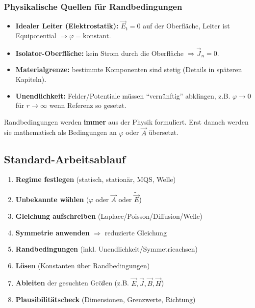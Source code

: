 \documentclass[a4paper]{article}
\newcommand{\imp}[1]{{\color{accent}\bfseries #1}}
\newcommand{\E}{\vec E}
\newcommand{\Hf}{\vec H}
\newcommand{\B}{\vec B}
\newcommand{\J}{\vec J}
\newcommand{\A}{\vec A}
\begin{document}
\subsubsection{Physikalische Quellen für Randbedingungen}
\begin{itemize}
  \item \imp{Idealer Leiter (Elektrostatik):} $\E_t=0$ auf der Oberfläche, Leiter ist Equipotential $\Rightarrow \varphi=\text{konstant}$.
  \item \imp{Isolator-Oberfläche:} kein Strom durch die Oberfläche $\Rightarrow \J_n=0$.
  \item \imp{Materialgrenze:} bestimmte Komponenten sind stetig (Details in späteren Kapiteln).
  \item \imp{Unendlichkeit:} Felder/Potentiale müssen ``vernünftig'' abklingen, z.B. $\varphi\to 0$ für $r\to\infty$ wenn Referenz so gesetzt.
\end{itemize}

\begin{merke}
Randbedingungen werden \imp{immer} aus der Physik formuliert.
Erst danach werden sie mathematisch als Bedingungen an $\varphi$ oder $\A$ übersetzt.
\end{merke}

\subsection{Standard-Arbeitsablauf}

\begin{vorgehen}
\begin{enumerate}
  \item \imp{Regime festlegen} (statisch, stationär, MQS, Welle)
  \item \imp{Unbekannte wählen} ($\varphi$ oder $\A$ oder $\tilde{\E}$)
  \item \imp{Gleichung aufschreiben} (Laplace/Poisson/Diffusion/Welle)
  \item \imp{Symmetrie anwenden} $\Rightarrow$ reduzierte Gleichung
  \item \imp{Randbedingungen} (inkl. Unendlichkeit/Symmetrieachsen)
  \item \imp{Lösen} (Konstanten über Randbedingungen)
  \item \imp{Ableiten} der gesuchten Größen (z.B. $\E,\J,\B,\Hf$)
  \item \imp{Plausibilitätscheck} (Dimensionen, Grenzwerte, Richtung)
\end{enumerate}
\end{vorgehen}
\end{document}
